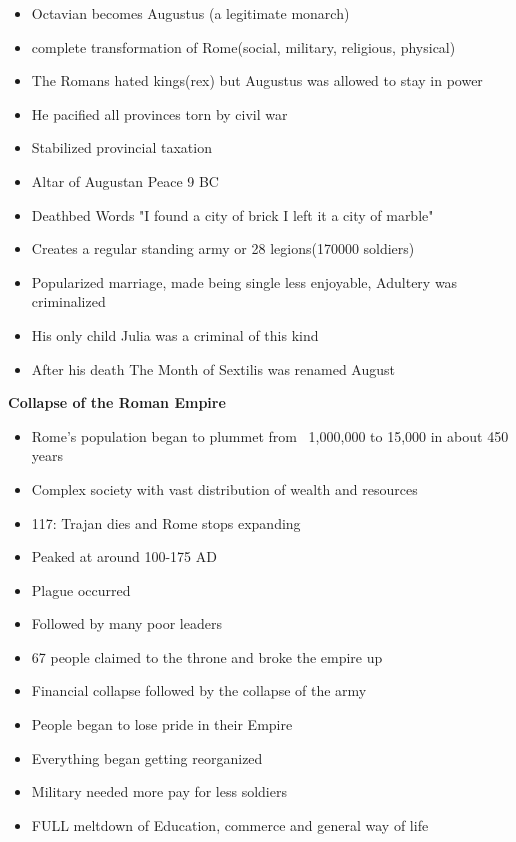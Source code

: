 \documentclass[12pt,a4paper]{report}
\begin{document}
\begin{itemize}
\item Octavian becomes Augustus (a legitimate monarch)
\item complete transformation of Rome(social, military, religious, physical)
\item The Romans hated kings(rex) but Augustus was allowed to stay in power
\item He pacified all provinces torn by civil war
\item Stabilized provincial taxation
\item Altar of Augustan Peace 9 BC
\item Deathbed Words "I found a city of brick I left it a city of marble"
\item Creates a regular standing army or 28 legions(170000 soldiers)
\item Popularized marriage, made being single less enjoyable, Adultery was criminalized
\item His only child Julia was a criminal of this kind
\item After his death The Month of Sextilis was renamed August
\end{itemize}
\textbf{Collapse of the Roman Empire}
\begin{itemize}
\item Rome's population began to plummet from ~1,000,000 to 15,000 in about 450 years
\item Complex society with vast distribution of wealth and resources
\item 117: Trajan dies and Rome stops expanding
\item Peaked at around 100-175 AD
\item Plague occurred
\item Followed by many poor leaders
\item 67 people claimed to the throne and broke the empire up
\item Financial collapse followed by the collapse of the army
\item People began to lose pride in their Empire
\item Everything began getting reorganized
\item Military needed more pay for less soldiers
\item FULL meltdown of Education, commerce and general way of life

\end{itemize}
\end{document}
